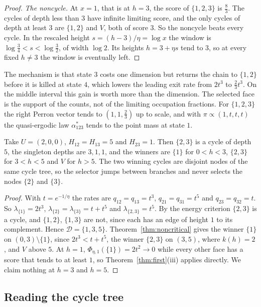\begin{proof}
\emph{The noncycle.} At $x=1$, that is at $h=3$, the score of $\{1,2,3\}$ is
$\frac83$. The cycles of depth less than $3$ have infinite limiting score, and
the only cycles of depth at least $3$ are $\{1,2\}$ and $V$, both of score $3$.
So the noncycle beats every cycle. In the rescaled height $s=(h-3)/\eta=\log x$ the window is
$\log\frac34<s<\log\frac32$, of width $\log2$. Its heights $h=3+\eta s$ tend to
$3$, so at every fixed $h\ne3$ the window is eventually left.
\end{proof}

The mechanism is that state $3$ costs one dimension but returns the chain to
$\{1,2\}$ before it is killed at state $4$, which lowers the leading exit rate
from $2t^3$ to $\frac23t^3$. On the middle interval this gain is worth more
than the dimension. The selected face is the support of the counts, not of the
limiting occupation fractions. For $\{1,2,3\}$ the right Perron vector tends to
$(1,1,\frac23)$ up to scale, and with $\pi\propto(1,t,t,t)$ the quasi-ergodic
law $\alpha^*_{123}$ tends to the point mass at state $1$.

\begin{example}\label{ex:branch-switch}
Take $U=(2,0,0)$, $H_{12}=H_{13}=5$ and $H_{23}=1$. Then $\{2,3\}$ is a cycle
of depth $5$, the singleton depths are $3,1,1$, and the winners are $\{1\}$
for $0<h<3$, $\{2,3\}$ for $3<h<5$ and $V$ for $h>5$. The two winning cycles
are disjoint nodes of the same cycle tree, so the selector jumps between
branches and never selects the nodes $\{2\}$ and $\{3\}$.
\end{example}

\begin{proof}
With $t=e^{-1/\eta}$ the rates are $q_{12}=q_{13}=t^3$, $q_{21}=q_{31}=t^5$ and
$q_{23}=q_{32}=t$. So $\lambda_{\{1\}}=2t^3$, $\lambda_{\{2\}}=\lambda_{\{3\}}=t+t^5$
and $\lambda_{\{2,3\}}=t^5$. By the energy criterion $\{2,3\}$ is a cycle, and
$\{1,2\}$, $\{1,3\}$ are not, since each has an edge of height $1$ to its
complement. Hence $\mathcal D=\{1,3,5\}$. Theorem~\ref{thm:noncritical} gives
the winner $\{1\}$ on $(0,3)\setminus\{1\}$, since $2t^3<t+t^5$, the winner
$\{2,3\}$ on $(3,5)$, where $k(h)=2$, and $V$ above $5$. At $h=1$,
$\Phi_{\eta,1}(\{1\})=2t^2\to0$ while every other face has a score that tends
to at least $1$, so Theorem~\ref{thm:first}(iii) applies directly. We claim
nothing at $h=3$ and $h=5$.
\end{proof}

\subsection{Reading the cycle tree}\label{sec:cycle-tree}

